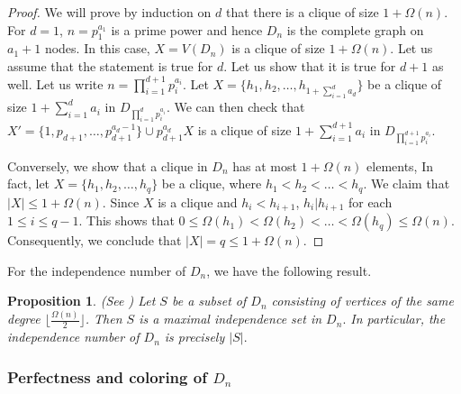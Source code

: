 \documentclass[11pt,a4paper]{amsart}
\newcommand{\jon}[1]{{\color{purple}#1}}
\newtheorem{prop}[thm]{Proposition}
\theoremstyle{definition}
\newtheorem{question}[thm]{Question}
\numberwithin{equation}{section}
\begin{document}

\begin{proof}
We will prove by induction on $d$ that there is a clique of size $1+\Omega(n).$ For $d=1$, $n=p_1^{a_1}$ is a prime power and hence $D_n$ is the complete graph on $a_1+1$ nodes. In this case, $X=V(D_n)$ is a clique of size $1+ \Omega(n).$ Let us assume that the statement is true for $d$. Let us show that it is true for $d+1$ as well. Let us write $n=\prod_{i=1}^{d+1} p_i^{a_i}.$ Let $X=\{h_1, h_2, \ldots, h_{1+\sum_{i=1}^d a_d} \}$ be a clique of size $1+\sum_{i=1}^d a_i$ in $D_{\prod_{i=1}^d p_i^{a_i}}$. We can then check that $X' = \{1, p_{d+1}, \ldots, p_{d+1}^{a_d-1} \} \cup p_{d+1}^{a_d} X$ is a clique of size $1+\sum_{i=1}^{d+1} a_i$ in $D_{\prod_{i=1}^{d+1} p_i^{a_i}}.$

Conversely, we show that a clique in $D_n$ has at most $1 + \Omega(n)$ elements, In fact, let $X=\{h_1, h_2, \ldots, h_q\}$ be a clique, where $h_1 < h_2 <\ldots<h_q.$ We claim that $|X| \leq 1 + \Omega(n).$ Since $X$ is a clique and $h_i<h_{i+1}$, $h_i | h_{i+1}$ for each $1 \leq i \leq q-1$. This shows that $0 \leq \Omega(h_1) < \Omega(h_2)< \ldots < \Omega(h_q) \leq \Omega(n).$ Consequently, we conclude that  $|X| = q \leq 1 +\Omega(n).$
\end{proof}

For the independence number of $D_n$, we have the following result. 
\begin{prop} (See \cite[Theorem 1]{divisor_numbers})
Let $S$ be a subset of $D_n$ consisting of vertices of the same degree $ \lfloor \frac{\Omega(n)}{2} \rfloor$. Then $S$ is a maximal independence set in $D_n.$ In particular, the independence number of $D_n$ is precisely $|S|. $
\end{prop}

\subsubsection{Perfectness and coloring of $D_n$}

\end{document}
